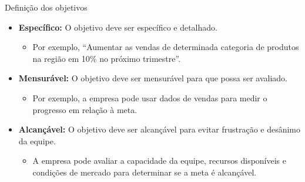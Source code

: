 \documentclass[
  ignorenonframetext,
  aspectratio=169,
]{beamer}
\providecommand{\tightlist}{%
  \setlength{\itemsep}{0pt}\setlength{\parskip}{0pt}}
\begin{document}
\begin{frame}{Definição dos objetivos}
\label{definiuxe7uxe3o-dos-objetivos-1}
\begin{itemize}
\item
  \textbf{Específico:} O objetivo deve ser específico e detalhado.

  \begin{itemize}
  \tightlist
  \item
    Por exemplo, ``Aumentar as vendas de determinada categoria de
    produtos na região em 10\% no próximo trimestre''.
  \end{itemize}
\end{itemize}

\pause

\begin{itemize}
\item
  \textbf{Mensurável:} O objetivo deve ser mensurável para que possa ser
  avaliado.

  \begin{itemize}
  \tightlist
  \item
    Por exemplo, a empresa pode usar dados de vendas para medir o
    progresso em relação à meta.
  \end{itemize}
\end{itemize}

\pause

\begin{itemize}
\item
  \textbf{Alcançável:} O objetivo deve ser alcançável para evitar
  frustração e desânimo da equipe.

  \begin{itemize}
  \tightlist
  \item
    A empresa pode avaliar a capacidade da equipe, recursos disponíveis
    e condições de mercado para determinar se a meta é alcançável.
  \end{itemize}
\end{itemize}
\end{frame}
\end{document}
